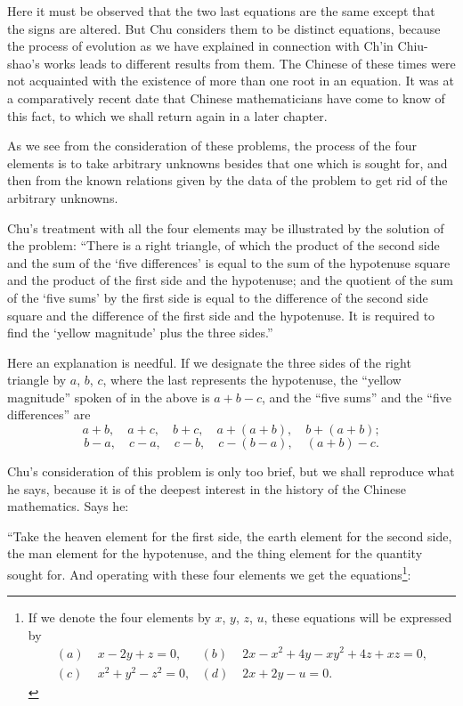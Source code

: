 \documentclass[11pt]{article}
\newcommand{\scanpage}[2]{\clearpage\setcounter{footnote}{0}\noindent{\footnotesize\color{gray}PDF page #1 · #2}\par\medskip}
\newcommand{\scanfooter}{}
\begin{document}
Here it must be observed that the two last equations are the same except that the signs are altered. But Chu considers them to be distinct equations, because the process of evolution as we have explained in connection with Ch'in Chiu-shao's works leads to different results from them. The Chinese of these times were not acquainted with the existence of more than one root in an equation. It was at a comparatively recent date that Chinese mathematicians have come to know of this fact, to which we shall return again in a later chapter.

As we see from the consideration of these problems, the process of the four elements is to take arbitrary unknowns besides that one which is sought for, and then from the known relations given by the data of the problem to get rid of the arbitrary unknowns.

Chu's treatment with all the four elements may be illustrated by the solution of the problem: ``There is a right triangle, of which the product of the second side and the sum of the `five differences' is equal to the sum of the hypotenuse square and the product of the first side and the hypotenuse; and the quotient of the sum of the `five sums' by the first side is equal to the difference of the second side square and the difference of the first side and the hypotenuse. It is required to find the `yellow magnitude' plus the three sides.''
\scanfooter

\scanpage{0107}{Chapter 14, printed page 93}
\setcounter{footnote}{0}
Here an explanation is needful. If we designate the three sides of the right triangle by $a$, $b$, $c$, where the last represents the hypotenuse, the ``yellow magnitude'' spoken of in the above is $a+b-c$, and the ``five sums'' and the ``five differences'' are
\[
a+b,\quad a+c,\quad b+c,\quad a+(a+b),\quad b+(a+b);
\]
\[
b-a,\quad c-a,\quad c-b,\quad c-(b-a),\quad (a+b)-c.
\]

Chu's consideration of this problem is only too brief, but we shall reproduce what he says, because it is of the deepest interest in the history of the Chinese mathematics. Says he:

``Take the heaven element for the first side, the earth element for the second side, the man element for the hypotenuse, and the thing element for the quantity sought for. And operating with these four elements we get the equations\footnote{If we denote the four elements by $x$, $y$, $z$, $u$, these equations will be expressed by
\[
\begin{aligned}
(a)\;&x-2y+z=0, & (b)\;&2x-x^2+4y-xy^2+4z+xz=0,\\
(c)\;&x^2+y^2-z^2=0, & (d)\;&2x+2y-u=0.
\end{aligned}
\]}:
\end{document}
